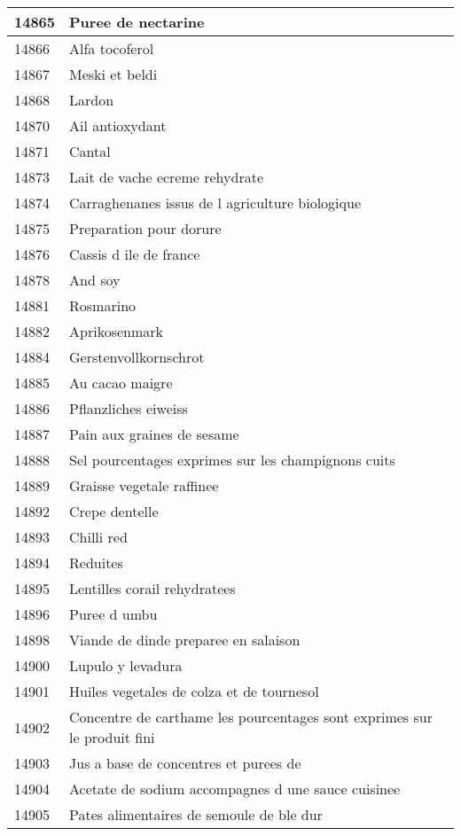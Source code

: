 \begin{longtable}{|l|l|}
14865 & Puree de nectarine \\ \hline 
14866 & Alfa tocoferol \\ \hline 
14867 & Meski et beldi \\ \hline 
14868 & Lardon \\ \hline 
14870 & Ail antioxydant \\ \hline 
14871 & Cantal \\ \hline 
14873 & Lait de vache ecreme rehydrate \\ \hline 
14874 & Carraghenanes  issus de l agriculture biologique \\ \hline 
14875 & Preparation pour dorure \\ \hline 
14876 & Cassis d ile de france \\ \hline 
14878 & And soy \\ \hline 
14881 & Rosmarino \\ \hline 
14882 & Aprikosenmark \\ \hline 
14884 & Gerstenvollkornschrot \\ \hline 
14885 & Au cacao maigre \\ \hline 
14886 & Pflanzliches eiweiss \\ \hline 
14887 & Pain aux graines de sesame \\ \hline 
14888 & Sel pourcentages exprimes sur les champignons cuits \\ \hline 
14889 & Graisse vegetale raffinee \\ \hline 
14892 & Crepe dentelle \\ \hline 
14893 & Chilli red \\ \hline 
14894 & Reduites \\ \hline 
14895 & Lentilles corail rehydratees \\ \hline 
14896 & Puree d umbu \\ \hline 
14898 & Viande de dinde preparee en salaison \\ \hline 
14900 & Lupulo y levadura \\ \hline 
14901 & Huiles vegetales de colza et de tournesol \\ \hline 
14902 & Concentre de carthame les pourcentages sont exprimes sur le produit fini \\ \hline 
14903 & Jus a base de concentres et purees de \\ \hline 
14904 & Acetate de sodium accompagnes d une sauce cuisinee \\ \hline 
14905 & Pates alimentaires de semoule de ble dur \\ \hline 

\end{longtable}
